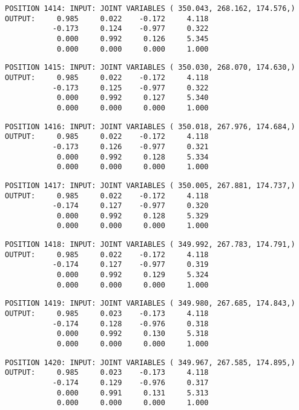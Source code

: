 \begin{verbatim}
POSITION 1414: INPUT: JOINT VARIABLES ( 350.043, 268.162, 174.576,)
OUTPUT:     0.985     0.022    -0.172     4.118
           -0.173     0.124    -0.977     0.322
            0.000     0.992     0.126     5.345
            0.000     0.000     0.000     1.000
\end{verbatim} \pagebreak[1]\begin{verbatim}
POSITION 1415: INPUT: JOINT VARIABLES ( 350.030, 268.070, 174.630,)
OUTPUT:     0.985     0.022    -0.172     4.118
           -0.173     0.125    -0.977     0.322
            0.000     0.992     0.127     5.340
            0.000     0.000     0.000     1.000
\end{verbatim} \pagebreak[1]\begin{verbatim}
POSITION 1416: INPUT: JOINT VARIABLES ( 350.018, 267.976, 174.684,)
OUTPUT:     0.985     0.022    -0.172     4.118
           -0.173     0.126    -0.977     0.321
            0.000     0.992     0.128     5.334
            0.000     0.000     0.000     1.000
\end{verbatim} \pagebreak[1]\begin{verbatim}
POSITION 1417: INPUT: JOINT VARIABLES ( 350.005, 267.881, 174.737,)
OUTPUT:     0.985     0.022    -0.172     4.118
           -0.174     0.127    -0.977     0.320
            0.000     0.992     0.128     5.329
            0.000     0.000     0.000     1.000
\end{verbatim} \pagebreak[1]\begin{verbatim}
POSITION 1418: INPUT: JOINT VARIABLES ( 349.992, 267.783, 174.791,)
OUTPUT:     0.985     0.022    -0.172     4.118
           -0.174     0.127    -0.977     0.319
            0.000     0.992     0.129     5.324
            0.000     0.000     0.000     1.000
\end{verbatim} \pagebreak[1]\begin{verbatim}
POSITION 1419: INPUT: JOINT VARIABLES ( 349.980, 267.685, 174.843,)
OUTPUT:     0.985     0.023    -0.173     4.118
           -0.174     0.128    -0.976     0.318
            0.000     0.992     0.130     5.318
            0.000     0.000     0.000     1.000
\end{verbatim} \pagebreak[1]\begin{verbatim}
POSITION 1420: INPUT: JOINT VARIABLES ( 349.967, 267.585, 174.895,)
OUTPUT:     0.985     0.023    -0.173     4.118
           -0.174     0.129    -0.976     0.317
            0.000     0.991     0.131     5.313
            0.000     0.000     0.000     1.000
\end{verbatim} \pagebreak[1]\begin{verbatim}

\end{verbatim}
